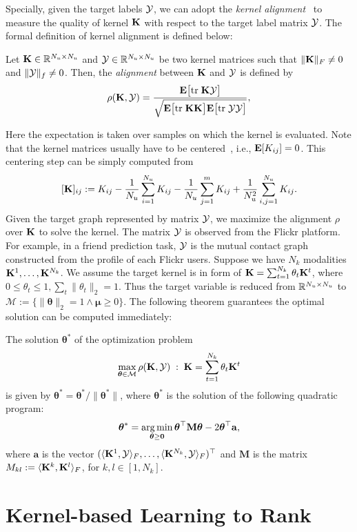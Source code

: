 Specially, given the target labels ${\cal Y}$, we can adopt the {\em kernel alignment}~\cite{nips/CristianiniSEK01} to measure the quality of kernel ${\mathbf K}$ with respect
to the target label matrix ${\cal Y}$. The formal definition of kernel alignment is defined below:
\begin{definition}
Let ${\mathbf K}\in{\mathbb R}^{N_u\times N_u}$ and ${\cal Y}\in{\mathbb R}^{N_u\times N_u}$ be two kernel matrices such that $\|{\mathbf K}\|_F\neq 0$ and $\|{\cal Y}\|_f\neq 0$. Then, the {\em alignment}
between ${\mathbf K}$ and ${\cal Y}$ is defined by
\[
\rho({\mathbf K}, {\cal Y}) = \frac{{\bf E}\big[{\mbox{tr}\;}{\mathbf K}{\cal Y}\big]}{\sqrt{{\bf E}\big[{\mbox{tr}\;}{\mathbf K}{\mathbf K}\big]{\bf E}\big[{\mbox{tr}\;}{\cal Y}{\cal Y}\big]}},
\]
\end{definition}
Here the expectation is taken over samples on which the kernel is evaluated.
Note that the kernel matrices usually have to be centered~\cite{icml/CortesMR10}, i.e., ${\bf E}[K_{ij}]=0$. This centering step can be simply computed from
\[
[{\mathbf K}]_{ij} := K_{ij}-\frac{1}{N_u}\sum_{i=1}^{N_u}K_{ij} - \frac{1}{N_u}\sum_{j=1}^mK_{ij}+\frac{1}{N_u^2}\sum_{i,j=1}^{N_u}K_{ij}.
\]
Given the target graph represented by matrix ${\cal Y}$, we maximize the alignment $\rho$ over ${\mathbf K}$ to solve the kernel. The matrix ${\cal Y}$ is observed from the Flickr
platform. For example, in a friend prediction task, ${\cal Y}$ is the mutual contact graph constructed from the profile of each Flickr users. Suppose we have $N_k$
modalities ${\mathbf K}^1,\ldots,{\mathbf K}^{N_k}$. We assume the target kernel is in form of ${\mathbf K} = \sum_{t=1}^{N_k}\theta_t{\mathbf K}^t$, where $0\leq \theta_t\leq 1, \sum_t\| \theta_t
\|_2= 1$. Thus the target variable is reduced from ${\mathbb R}^{N_u\times N_u}$ to $\mathcal M:=\big\{\|\bm\theta\|_2 = 1\wedge\bm\mu\geq 0\big\}$. The following
theorem guarantees the optimal solution can be computed immediately\cite{icml/CortesMR10}:
\begin{theorem}
The solution $\bm\theta^*$ of the optimization problem
\[
\max_{\boldsymbol{\theta}\in\mathcal M}\rho({\mathbf K},{\cal Y})\;:\;{\mathbf K}=\sum_{t=1}^{N_k}\theta_t{\mathbf K}^t
\]
is given by $\bm\theta^*=\bm\theta^*/\|\bm\theta^*\|$, where $\bm\theta^*$ is the solution of the following quadratic program:
\[
\bm\theta^*=\argmin_{\bm\theta\geq \0}\bm\theta^\top\mathbf M\bm\theta-2\bm\theta^\top\mathbf a,
\]
where $\mathbf a$ is the vector $(\langle {\mathbf K}^1,{\cal Y}\rangle_F,\ldots,\langle {\mathbf K}^{N_k},{\cal Y}\rangle_F)^\top$ and $\mathbf M$ is the matrix $M_{kl}:=\langle
{\mathbf K}^k,{\mathbf K}^l\rangle_F$, for $k,l\in[1,N_k]$.
\end{theorem}

\section{Kernel-based Learning to Rank}

